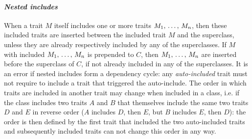 \paragraph{\em Nested includes}
When a trait $M$ itself includes one or more traits $M_1 ,\, \ldots ,\, M_n$, then these included traits are inserted between the included trait $M$ and the superclass, unless they are already respectively included by any of the superclasses. If $M$ with included $M_1 ,\, \ldots ,\, M_n$ is prepended to $C$, then $M_1 ,\, \ldots ,\, M_n$ are inserted before the superclass of $C$, if not already included in any of the superclasses. It is an error if nested includes form a dependency cycle: any {\em auto-included} trait must not require to include a trait that triggered the auto-include. The order in which traits are included in another trait may change when included in a class, i.e. if the class includes two traits $A$ and $B$ that themselves include the same two traits $D$ and $E$ in reverse order ($A$ includes $D$, then $E$, but $B$ includes $E$, then $D$): the order is then defined by the first trait that included the two auto-included traits and subsequently included traits can not change this order in any way. 

